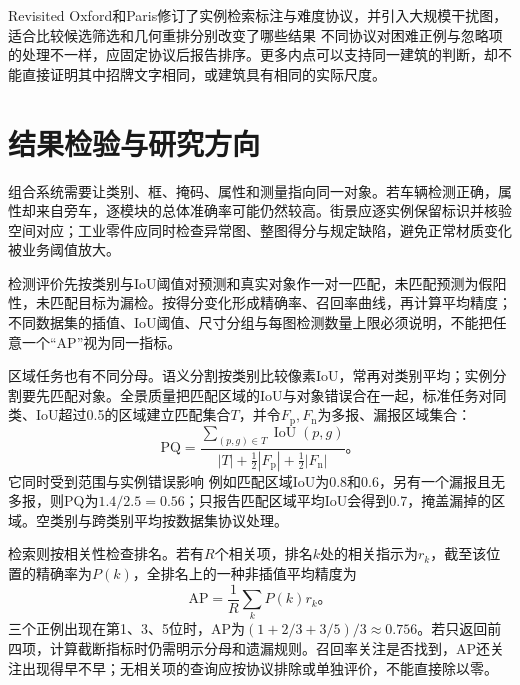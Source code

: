 Revisited Oxford和Paris修订了实例检索标注与难度协议，并引入大规模干扰图，适合比较候选筛选和几何重排分别改变了哪些结果
不同协议对困难正例与忽略项的处理不一样，应固定协议后报告排序。更多内点可以支持同一建筑的判断，却不能直接证明其中招牌文字相同，或建筑具有相同的实际尺度。

\section{结果检验与研究方向}
\label{sec:vision-recognition-evaluation}

组合系统需要让类别、框、掩码、属性和测量指向同一对象。若车辆检测正确，属性却来自旁车，逐模块的总体准确率可能仍然较高。街景应逐实例保留标识并核验空间对应；工业零件应同时检查异常图、整图得分与规定缺陷，避免正常材质变化被业务阈值放大。

检测评价先按类别与IoU阈值对预测和真实对象作一对一匹配，未匹配预测为假阳性，未匹配目标为漏检。按得分变化形成精确率、召回率曲线，再计算平均精度；不同数据集的插值、IoU阈值、尺寸分组与每图检测数量上限必须说明，不能把任意一个“AP”视为同一指标。

区域任务也有不同分母。语义分割按类别比较像素IoU，常再对类别平均；实例分割要先匹配对象。全景质量把匹配区域的IoU与对象错误合在一起，标准任务对同类、IoU超过0.5的区域建立匹配集合$T$，并令$F_{\mathrm{p}},F_{\mathrm{n}}$为多报、漏报区域集合：
\begin{equation}
 \mathrm{PQ}=
 \frac{\sum_{(p,g)\in T}\operatorname{IoU}(p,g)}
 {|T|+\frac12|F_{\mathrm{p}}|+\frac12|F_{\mathrm{n}}|}\text{。}
 \label{eq:vision-pq}
\end{equation}
它同时受到范围与实例错误影响
例如匹配区域IoU为0.8和0.6，另有一个漏报且无多报，则PQ为$1.4/2.5=0.56$；只报告匹配区域平均IoU会得到0.7，掩盖漏掉的区域。空类别与跨类别平均按数据集协议处理。

检索则按相关性检查排名。若有$R$个相关项，排名$k$处的相关指示为$r_k$，截至该位置的精确率为$P(k)$，全排名上的一种非插值平均精度为
\begin{equation}
 \mathrm{AP}=\frac1R\sum_k P(k)r_k\text{。}
 \label{eq:vision-retrieval-ap}
\end{equation}
三个正例出现在第1、3、5位时，AP为$(1+2/3+3/5)/3\approx0.756$。若只返回前四项，计算截断指标时仍需明示分母和遗漏规则。召回率关注是否找到，AP还关注出现得早不早；无相关项的查询应按协议排除或单独评价，不能直接除以零。

